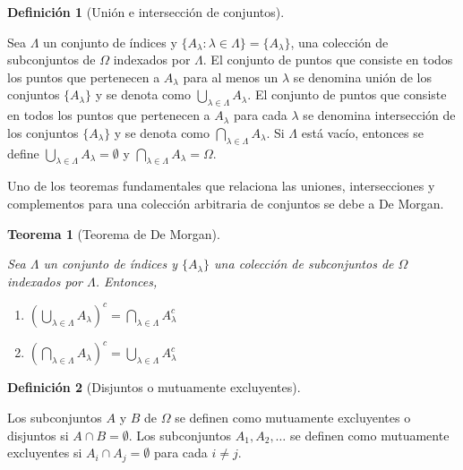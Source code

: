 \documentclass[
  us-letterpaper,
]{scrreprt}
\theoremstyle{plain}
\theoremstyle{definition}
\newtheorem{definition}{Definición}[chapter]
\theoremstyle{definition}
\theoremstyle{plain}
\newtheorem{theorem}{Teorema}[chapter]
\theoremstyle{remark}
\begin{document}
\begin{definition}[Unión e intersección de
conjuntos]\protect\hypertarget{def-UI}{}\label{def-UI}

Sea \(\Lambda\) un conjunto de índices y
\(\{A_\lambda: \lambda \in \Lambda\}= \{A_\lambda\}\), una colección de
subconjuntos de \(\Omega\) indexados por \(\Lambda\). El conjunto de
puntos que consiste en todos los puntos que pertenecen a \(A_\lambda\)
para al menos un \(\lambda\) se denomina unión de los conjuntos
\(\{A_\lambda\}\) y se denota como
\(\bigcup\limits_{\lambda\in \Lambda} A_\lambda\). El conjunto de puntos
que consiste en todos los puntos que pertenecen a \(A_\lambda\) para
cada \(\lambda\) se denomina intersección de los conjuntos
\(\{A_\lambda\}\) y se denota como
\(\bigcap\limits_{\lambda\in\Lambda} A_\lambda\). Si \(\Lambda\) está
vacío, entonces se define
\(\bigcup\limits_{\lambda\in \Lambda} A_\lambda = \emptyset\) y
\(\bigcap\limits_{\lambda\in\Lambda} A_\lambda=\Omega\).

\end{definition}

Uno de los teoremas fundamentales que relaciona las uniones,
intersecciones y complementos para una colección arbitraria de conjuntos
se debe a De Morgan.

\begin{theorem}[Teorema de De
Morgan]\protect\hypertarget{thm-morgan}{}\label{thm-morgan}

Sea \(\Lambda\) un conjunto de índices y \(\{A_\lambda\}\) una colección
de subconjuntos de \(\Omega\) indexados por \(\Lambda\). Entonces,

\begin{enumerate}
\def\labelenumi{\roman{enumi}.}
\item
  \(\left(\bigcup\limits_{\lambda\in\Lambda} A_\lambda\right)^c = \bigcap\limits_{\lambda\in\Lambda} A_\lambda^c\)
\item
  \(\left(\bigcap\limits_{\lambda\in\Lambda} A_\lambda\right)^c = \bigcup\limits_{\lambda\in\Lambda} A_\lambda^c\)
\end{enumerate}

\end{theorem}

\begin{definition}[Disjuntos o mutuamente
excluyentes]\protect\hypertarget{def-disjunto}{}\label{def-disjunto}

Los subconjuntos \(A\) y \(B\) de \(\Omega\) se definen como mutuamente
excluyentes o disjuntos si \(A\cap B=\emptyset\). Los subconjuntos
\(A_1, A_2, \ldots\) se definen como mutuamente excluyentes si
\(A_i\cap A_j=\emptyset\) para cada \(i\neq j\).

\end{definition}
\end{document}
